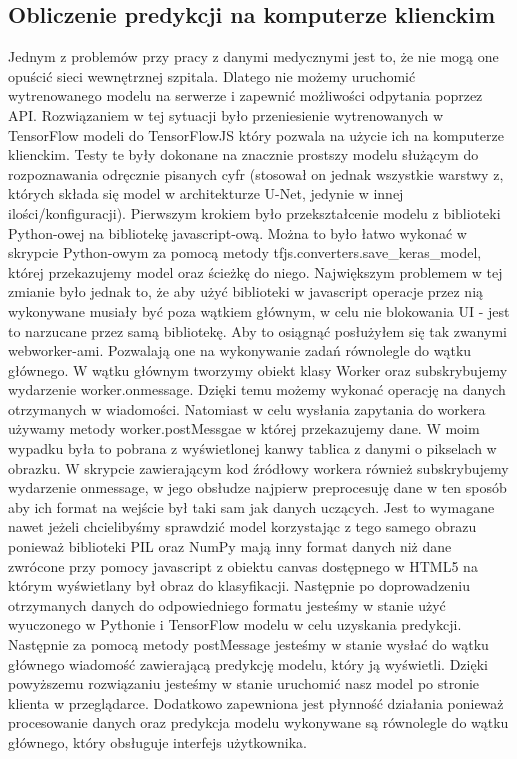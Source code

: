 \documentclass{article}
\begin{document}
\subsection{Obliczenie predykcji na komputerze klienckim}
Jednym z problemów przy pracy z danymi medycznymi jest to, że nie mogą one opuścić sieci wewnętrznej szpitala.
Dlatego nie możemy uruchomić wytrenowanego modelu na serwerze i zapewnić możliwości odpytania poprzez API.
Rozwiązaniem w tej sytuacji było przeniesienie wytrenowanych w TensorFlow modeli do TensorFlowJS który pozwala na użycie ich na komputerze klienckim.
Testy te były dokonane na znacznie prostszy modelu służącym do rozpoznawania odręcznie pisanych cyfr (stosował on jednak wszystkie warstwy z, których składa się model w architekturze U-Net, jedynie w innej ilości/konfiguracji).
Pierwszym krokiem było przekształcenie modelu z biblioteki Python-owej na bibliotekę javascript-ową.
Można to było łatwo wykonać w skrypcie Python-owym za pomocą metody tfjs.converters.save\_keras\_model, której przekazujemy model oraz ścieżkę do niego.
Największym problemem w tej zmianie było jednak to, że aby użyć biblioteki w javascript operacje przez nią wykonywane musiały być poza wątkiem głównym, w celu nie blokowania UI - jest to narzucane przez samą bibliotekę.
Aby to osiągnąć posłużyłem się tak zwanymi webworker-ami.
Pozwalają one na wykonywanie zadań równolegle do wątku głównego.
W wątku głównym tworzymy obiekt klasy Worker oraz subskrybujemy wydarzenie worker.onmessage.
Dzięki temu możemy wykonać operację na danych otrzymanych w wiadomości. Natomiast w celu wysłania zapytania do workera używamy metody worker.postMessgae w której przekazujemy dane.
W moim wypadku była to pobrana z wyświetlonej kanwy tablica z danymi o pikselach w obrazku.
W skrypcie zawierającym kod źródłowy workera również subskrybujemy wydarzenie onmessage, w jego obsłudze najpierw preprocesuję dane w ten sposób aby ich format na wejście był taki sam jak danych uczących.
Jest to wymagane nawet jeżeli chcielibyśmy sprawdzić model korzystając z tego samego obrazu ponieważ biblioteki PIL oraz NumPy mają inny format danych niż dane zwrócone przy pomocy javascript z obiektu canvas dostępnego w HTML5 na którym wyświetlany był obraz do klasyfikacji.
Następnie po doprowadzeniu otrzymanych danych do odpowiedniego formatu jesteśmy w stanie użyć wyuczonego w Pythonie i TensorFlow modelu w celu uzyskania predykcji.
Następnie za pomocą metody postMessage jesteśmy w stanie wysłać do wątku głównego wiadomość zawierającą predykcję modelu, który ją wyświetli.
Dzięki powyższemu rozwiązaniu jesteśmy w stanie uruchomić nasz model po stronie klienta w przeglądarce.
Dodatkowo zapewniona jest płynność działania ponieważ procesowanie danych oraz predykcja modelu wykonywane są równolegle do wątku głównego, który obsługuje interfejs użytkownika.
\newpage
\end{document}
